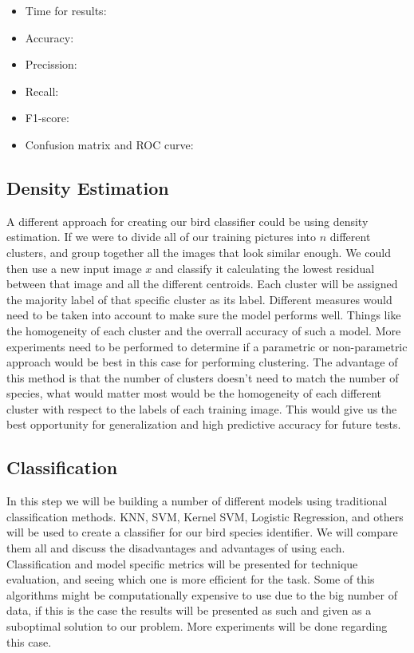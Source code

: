 \documentclass[11pt]{article}
\begin{document}
\begin{singlespace}
\begin{itemize}
\item Time for results: 
\item Accuracy: 
\item Precission: 
\item Recall: 
\item F1-score: 
\item Confusion matrix and ROC curve:
\end{itemize}

\subsection{Density Estimation}

A different approach for creating our bird classifier could be using density estimation. If we were to divide all of our training pictures into $n$ different clusters, and group together all the images that look similar enough. We could then use a new input image $x$ and classify it calculating the lowest residual between that image and all the different centroids. Each cluster will be assigned the majority label of that specific cluster as its label. Different measures would need to be taken into account to make sure the model performs well. Things like the homogeneity of each cluster and the overrall accuracy of such a model. More experiments need to be performed to determine if a parametric or non-parametric approach would be best in this case for performing clustering. The advantage of this method is that the number of clusters doesn't need to match the number of species, what would matter most would be the homogeneity of each different cluster with respect to the labels of each training image. This would give us the best opportunity for generalization and high predictive accuracy for future tests. 

\subsection{Classification}

In this step we will be building a number of different models using traditional classification methods. KNN, SVM, Kernel SVM, Logistic Regression, and others will be used to create a classifier for our bird species identifier. We will compare them all and discuss the disadvantages and advantages of using each. Classification and model specific metrics will be presented for technique evaluation, and seeing which one is more efficient for the task. Some of this algorithms might be computationally expensive to use due to the big number of data, if this is the case the results will be presented as such and given as a suboptimal solution to our problem. More experiments will be done regarding this case. 


\end{singlespace}
\end{document}
